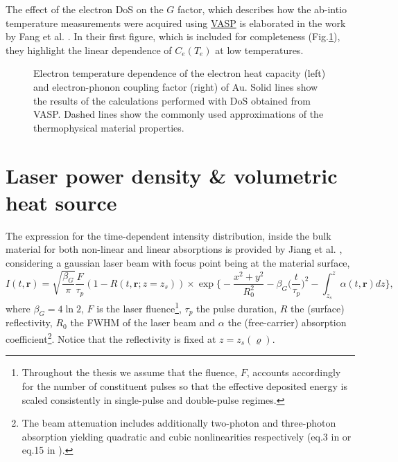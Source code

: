 
The effect of the electron DoS on the $G$ factor, which describes how the ab-intio temperature measurements were acquired using \href{https://www.vasp.at/}{VASP} is elaborated in the work by Fang et al. \cite{Fang_2012}.
In their first figure, which is included for completeness (Fig.\ref{fig:ch1-ce-g-literature}),
they highlight the linear dependence of $C_e(T_e)$ at low temperatures.

\begin{figure}[H]
  \centering
  \PublicFigureOmitted[0.85\linewidth]
  \caption{Electron temperature dependence of the electron heat capacity (left) and electron-phonon coupling factor (right) of Au. Solid lines show the results of the calculations performed with DoS obtained from VASP. Dashed lines show the commonly used approximations of the thermophysical material properties. \cite{Fang_2012}}
  \label{fig:ch1-ce-g-literature}
\end{figure}

\section{Laser power density \& volumetric heat source}
\label{sec:ch1-heat-source}

The expression for the time-dependent intensity distribution, inside the bulk material for both non-linear and linear
absorptions is provided by Jiang et al. \cite{Jiang_2004}, considering a gaussian laser beam with focus point being at the material surface,
\begin{equation}
  I(t, \mathbf{r}) = \sqrt{\frac{\beta_G}{\pi}} \frac{F}{\tau_p} (1 - R(t, \mathbf{r}; z=z_s))\times \exp \biggl\{ - \frac{x^2 + y^2}{R_0^2} - \beta_G \biggr(\frac{t}{\tau_p}\biggl)^2 - \int_{z_s}^z \alpha(t, \mathbf{r})dz \biggr\},
  \label{eq:ch1-intensity_distribution}
\end{equation}
where $\beta_G = 4\ln2$, $F$ is the laser fluence\footnote{
  Throughout the thesis we assume that the fluence, $F$,
  accounts accordingly for the number of constituent pulses
  so that the effective deposited energy is scaled consistently in single-pulse and double-pulse regimes.
}, $\tau_p$ the pulse duration, $R$ the (surface) reflectivity,
$R_0$ the FWHM of the laser beam and
$\alpha$ the (free-carrier) absorption coefficient\footnote{
  The beam attenuation includes additionally two-photon and three-photon absorption yielding quadratic and cubic nonlinearities respectively (eq.3 in \cite{Tsibidis_2019} or eq.15 in \cite{Driel_1987}).
}. Notice that the reflectivity is fixed at $z=z_s(\varrho)$.

